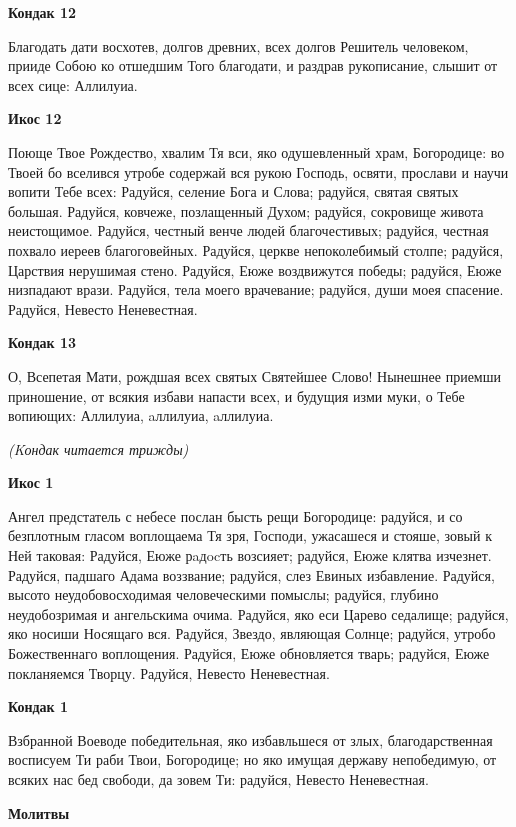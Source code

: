 \bfseries Кондак 12\normalfont{}\nopagebreak


Благодать дати восхотев, долгов древних, всех долгов Решитель человеком, прииде Собою ко отшедшим Того благодати, и раздрав рукописание, слышит от всех сице: Аллилуиа.


\bfseries Икос 12\normalfont{}\nopagebreak


Поюще Твое Рождество, хвалим Тя вси, яко одушевленный храм, Богородице: во Твоей бо вселився утробе содержай вся рукою Господь, освяти, прослави и научи вопити Тебе всех: Радуйся, селение Бога и Слова; радуйся, святая святых большая. Радуйся, ковчеже, позлащенный Духом; радуйся, сокровище живота неистощимое. Радуйся, честный венче людей благочестивых; радуйся, честная похвало иереев благоговейных. Радуйся, церкве непоколебимый столпе; радуйся, Царствия нерушимая стено. Радуйся, Еюже воздвижутся победы; радуйся, Еюже низпадают врази. Радуйся, тела моего врачевание; радуйся, души моея спасение. Радуйся, Невесто Неневестная.


\bfseries Кондак 13\normalfont{}\nopagebreak


О, Всепетая Мати, рождшая всех святых Святейшее Слово! Нынешнее приемши приношение, от всякия избави напасти всех, и будущия изми муки, о Тебе вопиющих: Аллилуиа, aллилуиа, aллилуиа.


\itshape (Kондак читается трижды)\normalfont{}


\bfseries Икос 1\normalfont{}\nopagebreak


Ангел предстатель с небесе послан бысть рещи Богородице: радуйся, и со безплотным гласом воплощаема Тя зря, Господи, ужасашеся и стояше, зовый к Ней таковая: Радуйся, Еюже рaдocть возсияет; радуйся, Еюже клятва изчезнет. Радуйся, падшаго Адама воззвание; радуйся, слез Евиных избавление. Радуйся, высото неудобовосходимая человеческими помыслы; радуйся, глубино неудобозримая и ангельскима очима. Радуйся, яко еси Царево седалище; радуйся, яко носиши Носящаго вся. Радуйся, Звездо, являющая Солнце; радуйся, утробо Божественнаго воплощения. Радуйся, Еюже обновляется тварь; радуйся, Еюже покланяемся Творцу. Радуйся, Невесто Неневестная.


\bfseries Кондак 1\normalfont{}\nopagebreak


Взбранной Воеводе победительная, яко избавльшеся от злых, благодарственная восписуем Ти раби Твои, Богородице; но яко имущая державу непобедимую, от всяких нас бед свободи, да зовем Ти: радуйся, Невесто Неневестная.


\bfseries Молитвы\normalfont{}\nopagebreak


